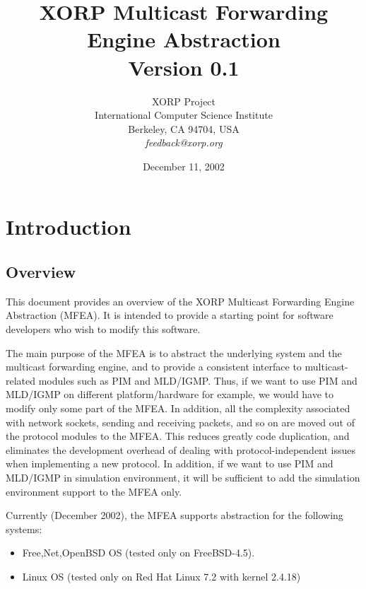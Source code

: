\documentclass[11pt]{article}
\begin{document}
\title{XORP Multicast Forwarding Engine Abstraction \\
\vspace{1ex}
Version 0.1}
\author{ XORP Project					\\
	 International Computer Science Institute	\\
	 Berkeley, CA 94704, USA			\\
	 {\it feedback@xorp.org}
}
\date{December 11, 2002}

\maketitle

\thispagestyle{empty}


\section{Introduction}


\subsection{Overview}

This document provides an overview of the XORP Multicast Forwarding
Engine Abstraction (MFEA). It is intended to provide a starting point
for software developers who wish to modify this software.

The main purpose of the MFEA is to abstract the underlying system and
the multicast forwarding engine, and to provide a consistent interface
to multicast-related modules such as PIM and MLD/IGMP. Thus, if we want
to use PIM and MLD/IGMP on different platform/hardware for example, we
would have to modify only some part of the MFEA. In addition, all the
complexity associated with network sockets, sending and receiving
packets, and so on are moved out of the protocol modules to the
MFEA. This reduces greatly code duplication, and eliminates the
development overhead of dealing with protocol-independent issues when
implementing a new protocol. In addition, if we want to use PIM and
MLD/IGMP in simulation environment, it will be sufficient to add the
simulation environment support to the MFEA only.

Currently (December 2002), the MFEA supports abstraction for
the following systems:

\begin{itemize}
  \item {Free,Net,Open}BSD OS (tested only on FreeBSD-4.5).
  \item Linux OS (tested only on Red Hat Linux 7.2 with kernel 2.4.18)
\end{itemize}
\end{document}
